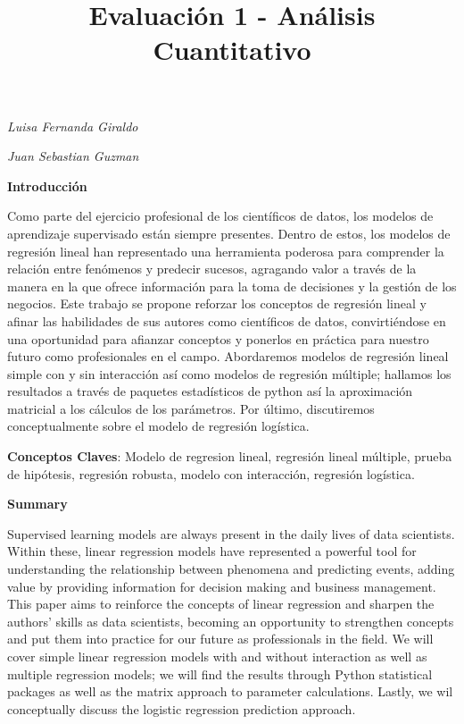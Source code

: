 \documentclass[11pt]{article}
\title{Evaluación 1 - Análisis Cuantitativo}
\begin{document}
    
    \maketitle
    
    

    
    \emph{Luisa Fernanda Giraldo }

\emph{Juan Sebastian Guzman }

     \textbf{Introducción}

Como parte del ejercicio profesional de los científicos de datos, los
modelos de aprendizaje supervisado están siempre presentes. Dentro de
estos, los modelos de regresión lineal han representado una herramienta
poderosa para comprender la relación entre fenómenos y predecir sucesos,
agragando valor a través de la manera en la que ofrece información para
la toma de decisiones y la gestión de los negocios. Este trabajo se
propone reforzar los conceptos de regresión lineal y afinar las
habilidades de sus autores como científicos de datos, convirtiéndose en
una oportunidad para afianzar conceptos y ponerlos en práctica para
nuestro futuro como profesionales en el campo. Abordaremos modelos de
regresión lineal simple con y sin interacción así como modelos de
regresión múltiple; hallamos los resultados a través de paquetes
estadísticos de python así la aproximación matricial a los cálculos de
los parámetros. Por último, discutiremos conceptualmente sobre el modelo
de regresión logística.

\textbf{Conceptos Claves}: Modelo de regresion lineal, regresión lineal
múltiple, prueba de hipótesis, regresión robusta, modelo con
interacción, regresión logística.

 \textbf{Summary}

Supervised learning models are always present in the daily lives of data
scientists. Within these, linear regression models have represented a
powerful tool for understanding the relationship between phenomena and
predicting events, adding value by providing information for decision
making and business management. This paper aims to reinforce the
concepts of linear regression and sharpen the authors' skills as data
scientists, becoming an opportunity to strengthen concepts and put them
into practice for our future as professionals in the field. We will
cover simple linear regression models with and without interaction as
well as multiple regression models; we will find the results through
Python statistical packages as well as the matrix approach to parameter
calculations. Lastly, we wil conceptually discuss the logistic
regression prediction approach.
\end{document}
